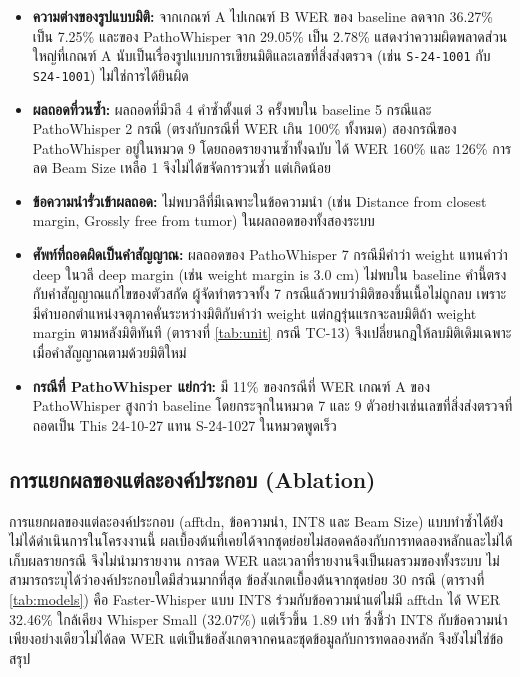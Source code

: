 \begin{itemize}
    \item \textbf{ความต่างของรูปแบบมิติ:} จากเกณฑ์ A ไปเกณฑ์ B WER ของ baseline ลดจาก 36.27\% เป็น 7.25\% และของ PathoWhisper จาก 29.05\% เป็น 2.78\% แสดงว่าความผิดพลาดส่วนใหญ่ที่เกณฑ์ A นับเป็นเรื่องรูปแบบการเขียนมิติและเลขที่สิ่งส่งตรวจ (เช่น \texttt{S-24-1001} กับ \texttt{S24-1001}) ไม่ใช่การได้ยินผิด
    \item \textbf{ผลถอดที่วนซ้ำ:} ผลถอดที่มีวลี 4 คำซ้ำตั้งแต่ 3 ครั้งพบใน baseline 5 กรณีและ PathoWhisper 2 กรณี (ตรงกับกรณีที่ WER เกิน 100\% ทั้งหมด) สองกรณีของ PathoWhisper อยู่ในหมวด 9 โดยถอดรายงานซ้ำทั้งฉบับ ได้ WER 160\% และ 126\% การลด Beam Size เหลือ 1 จึงไม่ได้ขจัดการวนซ้ำ แต่เกิดน้อย
    \item \textbf{ข้อความนำรั่วเข้าผลถอด:} ไม่พบวลีที่มีเฉพาะในข้อความนำ (เช่น Distance from closest margin, Grossly free from tumor) ในผลถอดของทั้งสองระบบ
    \item \textbf{ศัพท์ที่ถอดผิดเป็นคำสัญญาณ:} ผลถอดของ PathoWhisper 7 กรณีมีคำว่า weight แทนคำว่า deep ในวลี deep margin (เช่น weight margin is 3.0 cm) ไม่พบใน baseline คำนี้ตรงกับคำสัญญาณแก้ไขของตัวสกัด ผู้จัดทำตรวจทั้ง 7 กรณีแล้วพบว่ามิติของชิ้นเนื้อไม่ถูกลบ เพราะมีคำบอกตำแหน่งจตุภาคคั่นระหว่างมิติกับคำว่า weight แต่กฎรุ่นแรกจะลบมิติถ้า weight margin ตามหลังมิติทันที (ตารางที่ \ref{tab:unit} กรณี TC-13) จึงเปลี่ยนกฎให้ลบมิติเดิมเฉพาะเมื่อคำสัญญาณตามด้วยมิติใหม่
    \item \textbf{กรณีที่ PathoWhisper แย่กว่า:} มี 11\% ของกรณีที่ WER เกณฑ์ A ของ PathoWhisper สูงกว่า baseline โดยกระจุกในหมวด 7 และ 9 ตัวอย่างเช่นเลขที่สิ่งส่งตรวจที่ถอดเป็น This 24-10-27 แทน S-24-1027 ในหมวดพูดเร็ว
\end{itemize}

\subsection{การแยกผลของแต่ละองค์ประกอบ (Ablation)}

การแยกผลของแต่ละองค์ประกอบ (afftdn, ข้อความนำ, INT8 และ Beam Size) แบบทำซ้ำได้ยังไม่ได้ดำเนินการในโครงงานนี้ ผลเบื้องต้นที่เคยได้จากชุดย่อยไม่สอดคล้องกับการทดลองหลักและไม่ได้เก็บผลรายกรณี จึงไม่นำมารายงาน การลด WER และเวลาที่รายงานจึงเป็นผลรวมของทั้งระบบ ไม่สามารถระบุได้ว่าองค์ประกอบใดมีส่วนมากที่สุด ข้อสังเกตเบื้องต้นจากชุดย่อย 30 กรณี (ตารางที่ \ref{tab:models}) คือ Faster-Whisper แบบ INT8 ร่วมกับข้อความนำแต่ไม่มี afftdn ได้ WER 32.46\% ใกล้เคียง Whisper Small (32.07\%) แต่เร็วขึ้น 1.89 เท่า ซึ่งชี้ว่า INT8 กับข้อความนำเพียงอย่างเดียวไม่ได้ลด WER แต่เป็นข้อสังเกตจากคนละชุดข้อมูลกับการทดลองหลัก จึงยังไม่ใช่ข้อสรุป

